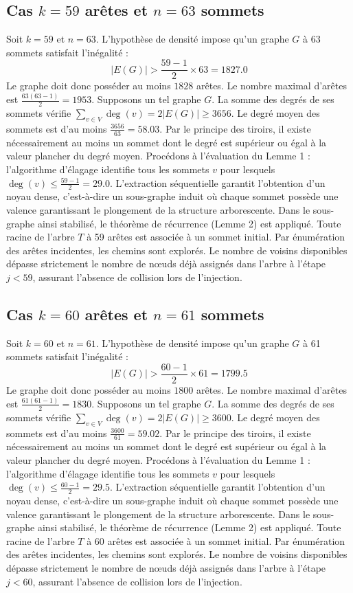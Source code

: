 \documentclass[12pt,a4paper]{article}
\begin{document}
\subsection{Cas $k = 59$ arêtes et $n = 63$ sommets}
Soit $k = 59$ et $n = 63$. L'hypothèse de densité impose qu'un graphe $G$ à 63 sommets satisfait l'inégalité :
$$ |E(G)| > \frac{59-1}{2} \times 63 = 1827.0 $$
Le graphe doit donc posséder au moins $1828$ arêtes. Le nombre maximal d'arêtes est $\frac{63(63-1)}{2} = 1953$.
Supposons un tel graphe $G$. La somme des degrés de ses sommets vérifie $\sum_{v \in V} \deg(v) = 2|E(G)| \geq 3656$.
Le degré moyen des sommets est d'au moins $\frac{3656}{63} = 58.03$.
Par le principe des tiroirs, il existe nécessairement au moins un sommet dont le degré est supérieur ou égal à la valeur plancher du degré moyen.
Procédons à l'évaluation du Lemme 1 : l'algorithme d'élagage identifie tous les sommets $v$ pour lesquels $\deg(v) \leq \frac{59-1}{2} = 29.0$.
L'extraction séquentielle garantit l'obtention d'un noyau dense, c'est-à-dire un sous-graphe induit où chaque sommet possède une valence garantissant le plongement de la structure arborescente.
Dans le sous-graphe ainsi stabilisé, le théorème de récurrence (Lemme 2) est appliqué. Toute racine de l'arbre $T$ à 59 arêtes est associée à un sommet initial. Par énumération des arêtes incidentes, les chemins sont explorés. Le nombre de voisins disponibles dépasse strictement le nombre de nœuds déjà assignés dans l'arbre à l'étape $j < 59$, assurant l'absence de collision lors de l'injection.

\subsection{Cas $k = 60$ arêtes et $n = 61$ sommets}
Soit $k = 60$ et $n = 61$. L'hypothèse de densité impose qu'un graphe $G$ à 61 sommets satisfait l'inégalité :
$$ |E(G)| > \frac{60-1}{2} \times 61 = 1799.5 $$
Le graphe doit donc posséder au moins $1800$ arêtes. Le nombre maximal d'arêtes est $\frac{61(61-1)}{2} = 1830$.
Supposons un tel graphe $G$. La somme des degrés de ses sommets vérifie $\sum_{v \in V} \deg(v) = 2|E(G)| \geq 3600$.
Le degré moyen des sommets est d'au moins $\frac{3600}{61} = 59.02$.
Par le principe des tiroirs, il existe nécessairement au moins un sommet dont le degré est supérieur ou égal à la valeur plancher du degré moyen.
Procédons à l'évaluation du Lemme 1 : l'algorithme d'élagage identifie tous les sommets $v$ pour lesquels $\deg(v) \leq \frac{60-1}{2} = 29.5$.
L'extraction séquentielle garantit l'obtention d'un noyau dense, c'est-à-dire un sous-graphe induit où chaque sommet possède une valence garantissant le plongement de la structure arborescente.
Dans le sous-graphe ainsi stabilisé, le théorème de récurrence (Lemme 2) est appliqué. Toute racine de l'arbre $T$ à 60 arêtes est associée à un sommet initial. Par énumération des arêtes incidentes, les chemins sont explorés. Le nombre de voisins disponibles dépasse strictement le nombre de nœuds déjà assignés dans l'arbre à l'étape $j < 60$, assurant l'absence de collision lors de l'injection.
\end{document}
